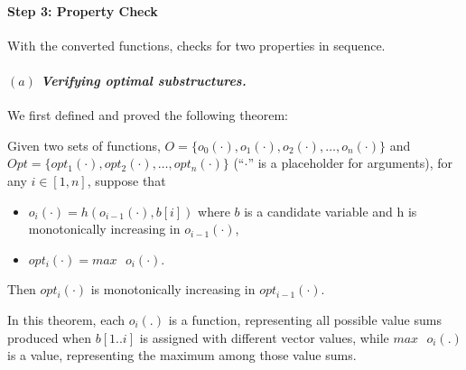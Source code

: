 

\paragraph{Step 3: Property Check}
With the converted functions, \tool checks for two properties in sequence. 

\paragraph{$(a)$ \emph{Verifying optimal substructures.}}
We first defined and proved the following theorem:

\begin{theorem}
\label{thm1}
Given two sets of functions, $O=\{o_0(\cdot), o_1(\cdot), o_2(\cdot),  \ldots, o_n(\cdot)\}$ and  $Opt=\{opt_1(\cdot), opt_2(\cdot), \ldots, opt_n(\cdot)\}$ (``$\cdot$'' is a placeholder for arguments), for any $i\in[1, n]$, suppose that
\begin{itemize}
    \item $o_i(\cdot)=h(o_{i-1}(\cdot), b[i])$ where $b$ is a candidate variable and h is monotonically increasing in $o_{i-1}(\cdot)$,  
    \item $opt_i(\cdot)=max\text{ }o_i(\cdot)$. 
\end{itemize}
Then $opt_i(\cdot)$ is monotonically increasing in $opt_{i-1}(\cdot)$. 
\end{theorem}

In this theorem, each $o_i(.)$ is a function, representing all possible value sums produced when $b[1..i]$ is assigned with different vector values, while $max\text{ }o_i(.)$ is a value, representing the maximum among those value sums.

